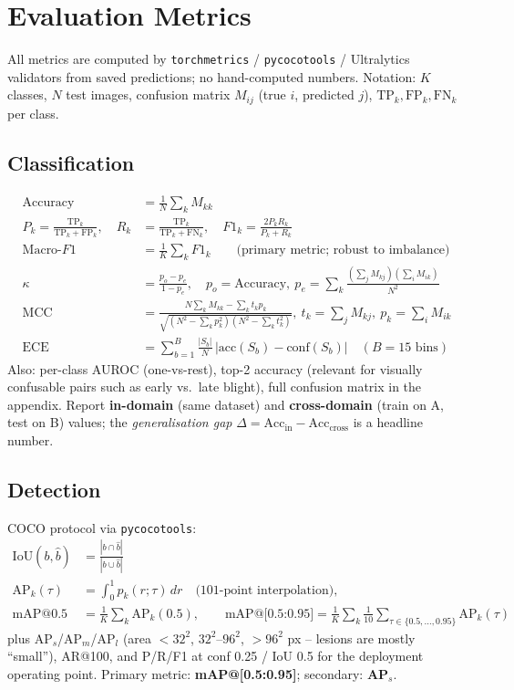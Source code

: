 \section{Evaluation Metrics}
\label{sec:metrics}
All metrics are computed by \texttt{torchmetrics} / \texttt{pycocotools} / Ultralytics validators from saved predictions; no hand-computed numbers. Notation: $K$ classes, $N$ test images, confusion matrix $M_{ij}$ (true $i$, predicted $j$), $\mathrm{TP}_k, \mathrm{FP}_k, \mathrm{FN}_k$ per class.

\subsection{Classification}
\begin{align}
\text{Accuracy} &= \tfrac{1}{N}\textstyle\sum_k M_{kk} \\
P_k = \tfrac{\mathrm{TP}_k}{\mathrm{TP}_k+\mathrm{FP}_k},\quad R_k &= \tfrac{\mathrm{TP}_k}{\mathrm{TP}_k+\mathrm{FN}_k},\quad F1_k = \tfrac{2P_kR_k}{P_k+R_k} \\
\text{Macro-}F1 &= \tfrac{1}{K}\textstyle\sum_k F1_k \qquad\text{(primary metric; robust to imbalance)}\\
\kappa &= \frac{p_o - p_e}{1-p_e},\quad p_o=\text{Accuracy},\ p_e = \textstyle\sum_k \tfrac{(\sum_j M_{kj})(\sum_i M_{ik})}{N^2}\\
\text{MCC} &= \frac{N\sum_k M_{kk} - \sum_k t_k p_k}{\sqrt{(N^2-\sum_k p_k^2)(N^2-\sum_k t_k^2)}},\ t_k=\textstyle\sum_j M_{kj},\ p_k=\textstyle\sum_i M_{ik}\\
\text{ECE} &= \textstyle\sum_{b=1}^{B} \tfrac{|S_b|}{N}\,\big|\mathrm{acc}(S_b)-\mathrm{conf}(S_b)\big| \quad (B=15 \text{ bins})
\end{align}
Also: per-class AUROC (one-vs-rest), top-2 accuracy (relevant for visually confusable pairs such as early vs.\ late blight), full confusion matrix in the appendix. Report \textbf{in-domain} (same dataset) and \textbf{cross-domain} (train on A, test on B) values; the \emph{generalisation gap} $\Delta = \text{Acc}_{\text{in}} - \text{Acc}_{\text{cross}}$ is a headline number.

\subsection{Detection}
COCO protocol via \texttt{pycocotools}:
\begin{align}
\text{IoU}(b,\hat b) &= \tfrac{|b\cap \hat b|}{|b\cup \hat b|} \\
\mathrm{AP}_k(\tau) &= \int_0^1 p_k(r;\tau)\,dr \quad \text{(101-point interpolation)},\\
\text{mAP@0.5} &= \tfrac1K\textstyle\sum_k \mathrm{AP}_k(0.5),\qquad
\text{mAP@[0.5{:}0.95]} = \tfrac1K\textstyle\sum_k \tfrac{1}{10}\sum_{\tau\in\{0.5,\dots,0.95\}} \mathrm{AP}_k(\tau)
\end{align}
plus AP$_s$/AP$_m$/AP$_l$ (area $<32^2$, $32^2$--$96^2$, $>96^2$ px -- lesions are mostly ``small''), AR@100, and P/R/F1 at conf 0.25 / IoU 0.5 for the deployment operating point. Primary metric: \textbf{mAP@[0.5:0.95]}; secondary: \textbf{AP$_s$}.

